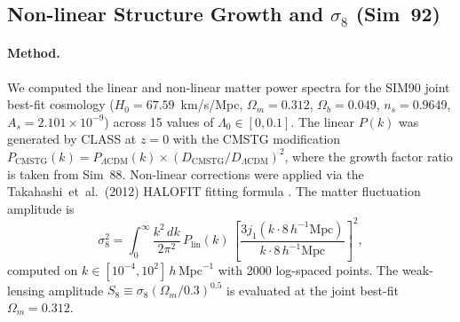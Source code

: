 \documentclass[12pt,a4paper]{article}
\begin{document}
\subsection{Non-linear Structure Growth and $\sigma_8$ (Sim~92)}
\label{sec:obs_sigma8}

\paragraph{Method.} We computed the linear and non-linear matter power spectra
for the SIM90 joint best-fit cosmology ($H_0 = 67.59$~km/s/Mpc, $\Omega_m = 0.312$,
$\Omega_b = 0.049$, $n_s = 0.9649$, $A_s = 2.101\times 10^{-9}$) across 15
values of $\Lambda_0 \in [0, 0.1]$. The linear $P(k)$ was generated by CLASS
at $z=0$ with the CMSTG modification $P_{\mathrm{CMSTG}}(k) = P_{\Lambda\mathrm{CDM}}(k)
\times (D_{\mathrm{CMSTG}}/D_{\Lambda\mathrm{CDM}})^2$, where the growth factor
ratio is taken from Sim~88. Non-linear corrections were applied via the
Takahashi~et~al.\ (2012) HALOFIT fitting formula \citep{Takahashi2012}. The
matter fluctuation amplitude is
\begin{equation}
\sigma_8^2 = \int_0^\infty \frac{k^2\,dk}{2\pi^2}\,P_{\mathrm{lin}}(k)\,
\left[\frac{3j_1(k\cdot 8\,h^{-1}\mathrm{Mpc})}{k\cdot 8\,h^{-1}\mathrm{Mpc}}\right]^2,
\end{equation}
computed on $k \in [10^{-4}, 10^2]\,h\,\mathrm{Mpc}^{-1}$ with 2000 log-spaced
points. The weak-lensing amplitude $S_8 \equiv \sigma_8(\Omega_m/0.3)^{0.5}$
is evaluated at the joint best-fit $\Omega_m = 0.312$.
\end{document}
